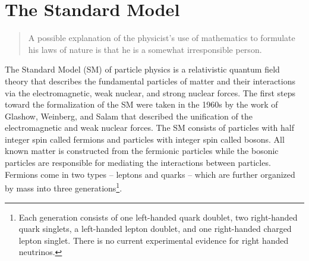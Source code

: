\chapter{The Standard Model}
\label{sec:standardModel}
\begin{quote}
  A possible explanation of the physicist's use of mathematics to formulate his laws of nature is that he is a somewhat irresponsible person.\\ 
\end{quote}

The Standard Model (SM) of particle physics is a relativistic quantum field theory that describes the fundamental particles of matter and their interactions via the electromagnetic, weak nuclear, and strong nuclear forces. The first steps toward the formalization of the SM were taken in the 1960s by the work of Glashow\cite{Glashow:1961tr}, Weinberg\cite{Weinberg:1967tq}, and Salam\cite{Salam:1968rm} that described the unification of the electromagnetic and weak nuclear forces. The SM consists of particles with half integer spin called fermions and particles with integer spin called bosons. All known matter is constructed from the fermionic particles while the bosonic particles are responsible for mediating the interactions between particles. Fermions come in two types -- leptons and quarks -- which are further organized by mass into three generations\footnote{Each generation consists of one left-handed quark doublet, two right-handed quark singlets, a left-handed lepton doublet, and one right-handed charged lepton singlet. There is no current experimental evidence for right handed neutrinos.\cite{Langacker, Rolnick}}. 

